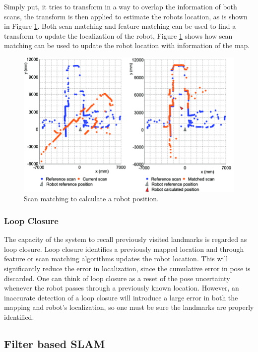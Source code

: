 Simply put, it tries to transform in a way to overlap the information of both scans, the transform is then applied to estimate the robots location, as is shown in Figure \ref*{fig: scan mathing algorithm}. Both scan matching and feature matching can be used to find a transform to update the localization of the robot, Figure \ref*{fig: scan mathing algorithm} shows how scan matching can be used to update the robot location with information of the map.

\begin{figure}[H]
    \centering
    \includegraphics[width=0.7\linewidth]{images/background/Scan-matching-problem-definition-a-Scans-before-alignment-b-Scans-after-alignment.png}
    \caption{Scan matching to calculate a robot position. \cite{konecny_scan_2019}}
    \label{fig: scan mathing algorithm}
\end{figure}

\subsubsection{Loop Closure}

The capacity of the system to recall previously visited landmarks is regarded as loop closure. Loop closure identifies a previously mapped location and through feature or scan matching algorithms updates the robot location. This will significantly reduce the error in localization, since the cumulative error in pose is discarded. One can think of loop closure as a reset of the pose uncertainty whenever the robot passes through a previously known location. However, an inaccurate detection of a loop closure will introduce a large error in both the mapping and robot's localization, so one must be sure the landmarks are properly identified.

\subsection{Filter based \acs*{SLAM}}

